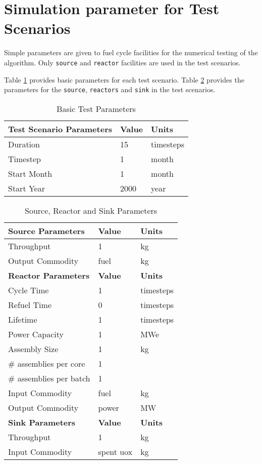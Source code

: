 \documentclass[11pt,letterpaper]{article}
\begin{document}
\section{Simulation parameter for Test Scenarios}
Simple parameters are given to fuel cycle facilities for the numerical testing of 
the algorithm.  Only \texttt{source} and \texttt{reactor} facilities are used in the test scenarios. 

Table \ref{tab:testscenario} provides basic parameters for each test scenario. Table \ref{tab:reactor} provides the parameters for the \texttt{source}, \texttt{reactors} and \texttt{sink} in the test scenarios.

\begin{table}[H]
	\centering
	\caption {Basic Test Parameters}
	\label{tab:testscenario}
	\begin{tabular}{|l|l|l|}
		\hline
		\textbf{Test Scenario Parameters} & \textbf{Value} & \textbf{Units} \\
		\hline
		Duration & 15 & timesteps \\
		Timestep & 1 & month \\
		Start Month & 1 & month \\
		Start Year & 2000 & year \\
		\hline
	\end{tabular}
\end{table}

\begin{table}[H]
	\centering
    \caption {Source, Reactor and Sink Parameters}
	\label{tab:reactor}
	\begin{tabular}{|l|l|l|}
\hline
\textbf{Source Parameters} & \textbf{Value} & \textbf{Units} \\
\hline
Throughput & 1 & kg \\
Output Commodity & fuel & kg\\
\hline
\textbf{Reactor Parameters} & \textbf{Value} & \textbf{Units} \\
\hline
Cycle Time & 1 & timesteps \\
Refuel Time & 0 & timesteps \\
Lifetime & 1 & timesteps \\
Power Capacity & 1& MWe \\
Assembly Size & 1 & kg \\
\# assemblies per core & 1 & \\
\# assemblies per batch & 1 & \\
Input Commodity & fuel & kg\\
Output Commodity & power & MW\\
\hline
\textbf{Sink Parameters} & \textbf{Value} & \textbf{Units} \\
Throughput & 1 & kg \\
Input Commodity & spent uox & kg\\
\hline
	\end{tabular}
\end{table}
\end{document}

